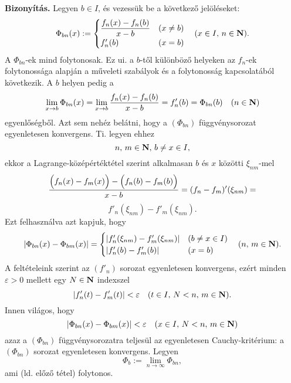 \textbf{Bizonyítás.} Legyen $b \in I$, és vezessük be a következő jelöléseket:
\[
	\Phi_{bn}(x) := \begin{cases}
		\displaystyle \frac{f_n(x) - f_n(b)}{x - b} & (x \neq b)\\
		f_n'(b) & (x = b) 
	\end{cases} \quad (x \in I, \, n \in \mathbf{N}).
\]
A $\Phi_{bn}$-ek mind folytonosak. Ez ui. a $b$-től különböző helyeken az $f_n$-ek folytonossága alapján a műveleti szabályok és a folytonosság kapcsolatából következik. A $b$ helyen pedig a
\[
	\lim_{x \to b} \Phi_{bn}(x) = \lim_{x \to b} \frac{f_n(x) - f_n(b)}{x- b} = f_n'(b) = \Phi_{bn}(b) \quad (n \in \mathbf{N})
\]
egyenlőségből. Azt sem nehéz belátni, hogy a $(\Phi_{bn})$ függvénysorozat egyenletesen konvergens. Ti. legyen ehhez
\[
	n, \, m \in \mathbf{N}, \, b \neq x \in I,
\]
ekkor a Lagrange-középértéktétel szerint alkalmasan $b$ és $x$ közötti $\xi_{nm}$-mel
\[
	\frac{ \Big( f_n(x) - f_m(x) \Big) - \Big(  f_n(b) - f_m(b)  \Big) }{x- b} = (f_n - f_m)'(\xi_{nm}) =
\]
\[
	f'_n(\xi_{nm}) -f'_m(\xi_{nm}).
\]
Ezt felhasználva azt kapjuk, hogy
\[
	|\Phi_{bn}(x) - \Phi_{bm}(x)| = \begin{cases}
		|f'_n(\xi_{nm}) -f'_m(\xi_{nm})| & (b \neq x \in I) \\
		|f'_n(b) - f_m'(b)| & (x = b) 
	\end{cases} \quad (n, \, m \in \mathbf{N}).
\]
A feltételeink szerint az $(f'_n)$ sorozat egyenletesen konvergens, ezért minden $\varepsilon > 0$ mellett egy $N \in \mathbf{N}$ indexszel
\[
	|f'_n(t) - f'_m(t)| < \varepsilon \quad (t \in I, \, N < n, \, m \in \mathbf{N}).
\]
Innen világos, hogy
\[
	|\Phi_{bn}(x) - \Phi_{bm}(x)| < \varepsilon \quad (x \in I, \, N < n, \, m \in \mathbf{N})
\]
azaz a $(\Phi_{bn})$ függvénysorozatra teljesül az egyenletesen Cauchy-kritérium: a $(\Phi_{bn})$ sorozat egyenletesen konvergens. Legyen
\[
	\Phi_b := \lim_{n \to \infty} \Phi_{bn},
\]
ami (ld. előző tétel) folytonos.\\

